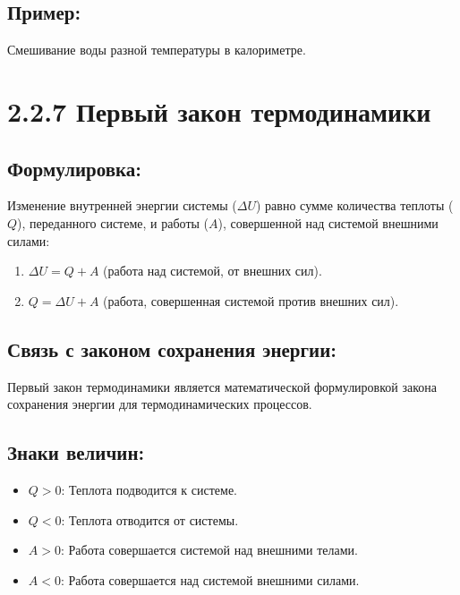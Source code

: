 \documentclass[a4paper,12pt]{article}
\begin{document}
\vspace{-9pt}
\subsection*{Пример:}
\vspace{-3pt}
Смешивание воды разной температуры в калориметре.



\section*{2.2.7 Первый закон термодинамики}
\vspace{-9pt}
\subsection*{Формулировка:}
\vspace{-3pt}
Изменение внутренней энергии системы ($\Delta U$) равно сумме количества теплоты ($Q$), переданного системе, и работы ($A$), совершенной над системой внешними силами:
\begin{enumerate}[itemsep=0pt, topsep=0pt, parsep=3pt]
    \item $\Delta U = Q + A$ (работа над системой, от внешних сил).
    \item $Q = \Delta U + A$ (работа, совершенная системой против внешних сил).
\end{enumerate}

\vspace{-9pt}
\subsection*{Связь с законом сохранения энергии:}
\vspace{-3pt}
Первый закон термодинамики является математической формулировкой закона сохранения энергии для термодинамических процессов.

\vspace{-9pt}
\subsection*{Знаки величин:}
\vspace{-3pt}
\begin{itemize}
    \item $Q > 0$: Теплота подводится к системе.
    \item $Q < 0$: Теплота отводится от системы.
    \item $A > 0$: Работа совершается системой над внешними телами.
    \item $A < 0$: Работа совершается над системой внешними силами.
\end{itemize}
\end{document}
